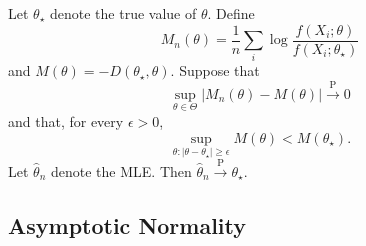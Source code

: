 \begin{theorem}
Let $\theta_{\star}$ denote the true value of $\theta$. Define
\[
M_n(\theta)=\frac{1}{n} \sum_i \log \frac{f\left(X_i ; \theta\right)}{f\left(X_i ; \theta_{\star}\right)}
\]and $M(\theta)=-D\left(\theta_{\star}, \theta\right)$. Suppose that
\[
\sup _{\theta \in \Theta}\left|M_n(\theta)-M(\theta)\right| \xrightarrow{\mathrm{P}} 0
\]and that, for every $\epsilon>0$,
\[
\sup _{\theta:\left|\theta-\theta_{\star}\right| \geq \epsilon} M(\theta)<M\left(\theta_{\star}\right) .
\]Let $\widehat{\theta}_n$ denote the MLE. Then $\widehat{\theta}_n \xrightarrow{\mathrm{P}} \theta_{\star}$.
\end{theorem}
\subsection{Asymptotic Normality}
